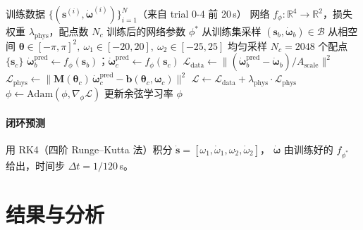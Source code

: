 \documentclass[a4paper,12pt]{ctexart}   %
\begin{document}
\begin{algorithm}[h]
\caption{PINN 训练循环（rc/pinn.py 实现）}
\label{alg:pinn-train}
\begin{algorithmic}[1]
\Require 训练数据 $\{(\bm{s}^{(i)}, \dot{\bm{\omega}}^{(i)})\}_{i=1}^N$（来自 trial 0-4 前 20\,s）
\Require 网络 $f_\phi : \mathbb{R}^4 \to \mathbb{R}^2$，损失权重 $\lambda_{\mathrm{phys}}$，配点数 $N_c$
\Ensure 训练后的网络参数 $\phi^*$
    \State 从训练集采样 $(\bm{s}_b, \dot{\bm{\omega}}_b) \in \mathcal{B}$
    \State 从相空间 $\bm{\theta} \in [-\pi, \pi]^2,\ \omega_1 \in [-20, 20],\ \omega_2 \in [-25, 25]$ 均匀采样 $N_c = 2048$ 个配点 $\{\bm{s}_c\}$
    \State $\dot{\bm{\omega}}_b^{\mathrm{pred}} \gets f_\phi(\bm{s}_b)$；\quad $\dot{\bm{\omega}}_c^{\mathrm{pred}} \gets f_\phi(\bm{s}_c)$
    \State $\mathcal{L}_{\mathrm{data}} \gets \| (\dot{\bm{\omega}}_b^{\mathrm{pred}} - \dot{\bm{\omega}}_b) / A_{\mathrm{scale}} \|^2$
    \State $\mathcal{L}_{\mathrm{phys}} \gets \| \bm{M}(\bm{\theta}_c) \, \dot{\bm{\omega}}_c^{\mathrm{pred}} - \bm{b}(\bm{\theta}_c, \bm{\omega}_c) \|^2$
    \State $\mathcal{L} \gets \mathcal{L}_{\mathrm{data}} + \lambda_{\mathrm{phys}} \cdot \mathcal{L}_{\mathrm{phys}}$
    \State $\phi \gets \mathrm{Adam}(\phi, \nabla_\phi \mathcal{L})$
  \EndFor
  \State 更新余弦学习率
\EndFor
\State \Return $\phi$
\end{algorithmic}
\end{algorithm}

\paragraph{闭环预测} 用 RK4（四阶 Runge--Kutta 法）积分 $\dot{\bm{s}} = [\omega_1, \dot\omega_1, \omega_2, \dot\omega_2]$，
$\dot{\bm{\omega}}$ 由训练好的 $f_{\phi^*}$ 给出，时间步 $\Delta t = 1/120$\,s。

\section{结果与分析}
\label{sec:results}
\end{document}
